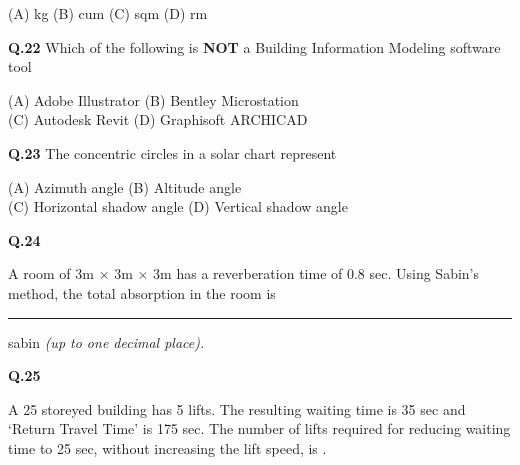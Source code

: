 \documentclass[journal,12pt,onecolumn]{IEEEtran}
\theoremstyle{remark}
\begin{document}
\begin{flushleft}
\hspace{1.8cm}(A) kg \hspace{1.8cm} (B) cum 
\hspace{1.8cm}(C) sqm \hspace{1.8cm} (D) rm 
\end{flushleft}

\vspace{0.5cm}

\textbf{Q.22} \hspace{0.3cm} Which of the following is \textbf{NOT} a Building Information Modeling software tool

\begin{flushleft}  
    \hspace{1.8cm} (A) Adobe Illustrator \hspace{2.1cm}   (B) Bentley Microstation\\ 
    \hspace{1.8cm} (C) Autodesk Revit  \hspace{2.365cm} (D) Graphisoft ARCHICAD 
\end{flushleft}

\vspace{0.5cm}

\textbf{Q.23} \hspace{0.3cm} The concentric circles in a solar chart represent

\begin{flushleft}
    

\hspace{1.8cm}  (A) Azimuth angle \hspace{2.6cm} (B) Altitude angle \\
\hspace{1.8cm}  (C) Horizontal shadow angle \hspace{1.09cm} (D) Vertical shadow angle 
\end{flushleft}
\vspace{0.5cm}

\textbf{Q.24} \hspace{0.3cm} \parbox[t]{14cm}{ A room of 3m $\times$ 3m $\times$ 3m has a reverberation time of 0.8 sec. Using Sabin's method, the total absorption in the room is \rule{4cm}{0.15mm} sabin \textit{(up to one decimal place).} }

\vspace*{1cm} 

\noindent
\hspace{0.6cm}\textbf{Q.25} \hspace{0.3cm} \parbox[t]{14 cm }{
A 25 storeyed building has 5 lifts. The resulting waiting time is 35 sec and `Return Travel Time' is 175 sec. The number of lifts required for reducing waiting time to 25 sec, without increasing the lift speed, is \underline{\hspace{3cm}}.}
\vspace{1.5cm}
\end{document}
